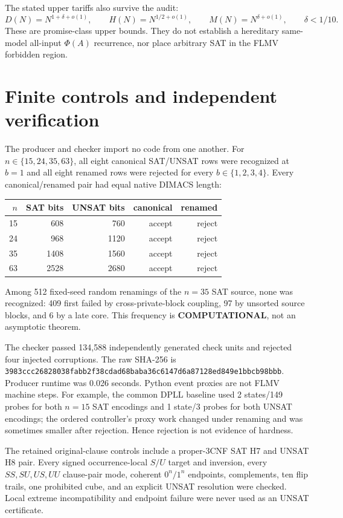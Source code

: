 \documentclass[11pt]{article}
\begin{document}
The stated upper tariffs also survive the audit:
\[
 D(N)=N^{1+\delta+o(1)},\qquad
 H(N)=N^{1/2+o(1)},\qquad
 M(N)=N^{\delta+o(1)},\qquad \delta<1/10.
\]
These are promise-class upper bounds.  They do not establish a hereditary
same-model all-input $\Phi(A)$ recurrence, nor place arbitrary SAT in the FLMV
forbidden region.

\section{Finite controls and independent verification}
The producer and checker import no code from one another.  For
$n\in\{15,24,35,63\}$, all eight canonical SAT/UNSAT rows were recognized at
$b=1$ and all eight renamed rows were rejected for every $b\in\{1,2,3,4\}$.
Every canonical/renamed pair had equal native DIMACS length:
\begin{center}\small
\begin{tabular}{rrrrr}\toprule
$n$ & SAT bits & UNSAT bits & canonical & renamed\\\midrule
15&608&760&accept&reject\\
24&968&1120&accept&reject\\
35&1408&1560&accept&reject\\
63&2528&2680&accept&reject\\\bottomrule
\end{tabular}
\end{center}
Among 512 fixed-seed random renamings of the $n=35$ SAT source, none was
recognized: 409 first failed by cross-private-block coupling, 97 by unsorted
source blocks, and 6 by a late core.  This frequency is \textbf{COMPUTATIONAL},
not an asymptotic theorem.

The checker passed 134,588 independently generated check units and rejected
four injected corruptions.  The raw SHA-256 is
\texttt{3983ccc26828038fabb2f38cdad68baba36c6147d6a87128ed849e1bbcb98bbb}.
Producer runtime was 0.026 seconds.  Python event proxies are not FLMV machine
steps.  For example, the common DPLL baseline used 2 states/149 probes for
both $n=15$ SAT encodings and 1 state/3 probes for both UNSAT encodings; the
ordered controller's proxy work changed under renaming and was sometimes
smaller after rejection.  Hence rejection is not evidence of hardness.

The retained original-clause controls include a proper-3CNF SAT H7 and UNSAT
H8 pair.  Every signed occurrence-local $S/U$ target and inversion, every
$SS,SU,US,UU$ clause-pair mode, coherent $0^n/1^n$ endpoints, complements,
ten flip trails, one prohibited cube, and an explicit UNSAT resolution were
checked.  Local extreme incompatibility and endpoint failure were never used
as an UNSAT certificate.
\end{document}
